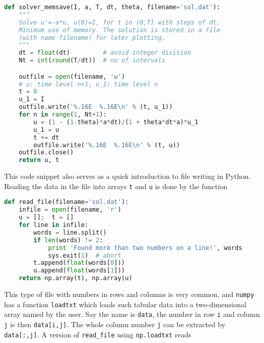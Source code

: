 \documentclass[graybox,sectrefs,envcountresetchap,open=right,final]{svmonodo}
\begin{document}
\begin{lstlisting}[language=python,style=blue1_bluegreen]
def solver_memsave(I, a, T, dt, theta, filename='sol.dat'):
    """
    Solve u'=-a*u, u(0)=I, for t in (0,T] with steps of dt.
    Minimum use of memory. The solution is stored in a file
    (with name filename) for later plotting.
    """
    dt = float(dt)         # avoid integer division
    Nt = int(round(T/dt))  # no of intervals

    outfile = open(filename, 'w')
    # u: time level n+1, u_1: time level n
    t = 0
    u_1 = I
    outfile.write('%.16E  %.16E\n' % (t, u_1))
    for n in range(1, Nt+1):
        u = (1 - (1-theta)*a*dt)/(1 + theta*dt*a)*u_1
        u_1 = u
        t += dt
        outfile.write('%.16E  %.16E\n' % (t, u))
    outfile.close()
    return u, t

\end{lstlisting}

This code snippet also serves as a quick introduction to file writing in Python.
Reading the data in the file into arrays \texttt{t} and \texttt{u} is done by the
function













\begin{lstlisting}[language=python,style=blue1_bluegreen]
def read_file(filename='sol.dat'):
    infile = open(filename, 'r')
    u = [];  t = []
    for line in infile:
        words = line.split()
        if len(words) != 2:
            print 'Found more than two numbers on a line!', words
            sys.exit(1)  # abort
        t.append(float(words[0]))
        u.append(float(words[1]))
    return np.array(t), np.array(u)

\end{lstlisting}


This type of file with numbers in rows and columns is very common, and
\texttt{numpy} has a function \texttt{loadtxt} which loads such tabular data into a
two-dimensional array named by the user. Say the name is \texttt{data}, the
number in row \texttt{i} and column \texttt{j} is then \texttt{data[i,j]}.  The whole
column number \texttt{j} can be extracted by \texttt{data[:,j]}.  A version of
\Verb!read_file! using \texttt{np.loadtxt} reads
\end{document}

